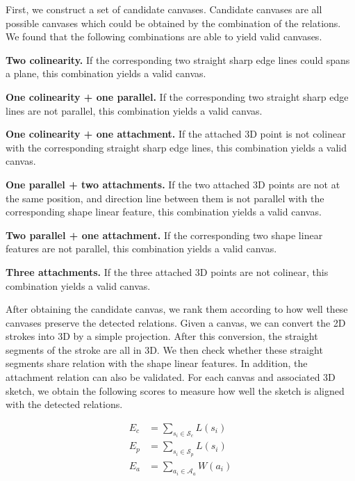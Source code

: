 First, we construct a set of candidate canvases. Candidate canvases are all possible canvases which could be obtained by the combination of the relations. We found that the following combinations are able to yield valid canvases.

\textbf{Two colinearity.} If the corresponding two straight sharp edge lines could spans a plane, this combination yields a valid canvas.

\textbf{One colinearity + one parallel.} If the corresponding two straight sharp edge lines are not parallel, this combination yields a valid canvas.

\textbf{One colinearity + one attachment.} If the attached 3{D} point is not colinear with the corresponding straight sharp edge lines, this combination yields a valid canvas.

\textbf{One parallel + two attachments.} If the two attached 3{D} points are not at the same position, and direction line between them is not parallel with the corresponding shape linear feature, this combination yields a valid canvas.

\textbf{Two parallel + one attachment.} If the corresponding two shape linear features are not parallel, this combination yields a valid canvas.

\textbf{Three attachments.} If the three attached 3D points are not colinear, this combination yields a valid canvas.

After obtaining the candidate canvas, we rank them according to how well these canvases preserve the detected relations. Given a canvas, we can convert the 2D strokes into 3D by a simple projection. After this conversion, the straight segments of the stroke are all in 3D. We then check whether these straight segments share relation with the shape linear features. In addition, the attachment relation can also be validated. For each canvas and associated 3D sketch, we obtain the following scores to measure how well the sketch is aligned with the detected relations.

\begin{equation}
\begin{aligned}
E_c &= \sum_{s_i\in \mathcal{S}_c} L(s_i)\\
E_p &= \sum_{s_i\in \mathcal{S}_p} L(s_i)\\
E_a &= \sum_{a_i\in \mathcal{A}_a} W(a_i)\\
\end{aligned}
\end{equation}

